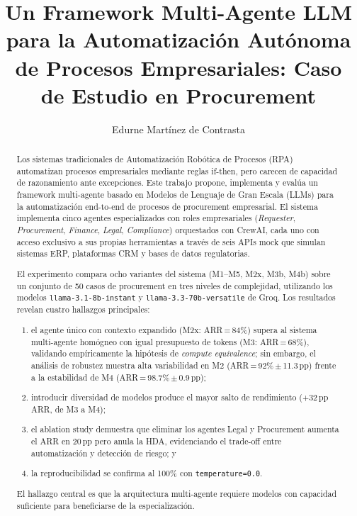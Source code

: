 \documentclass[preprint,12pt,authoryear]{elsarticle}
\begin{document}
\begin{frontmatter}

\title{Un Framework Multi-Agente LLM para la Automatizaci\'on Aut\'onoma
       de Procesos Empresariales: Caso de Estudio en Procurement}

\author[uax,proj]{Edurne Mart\'inez de Contrasta}

\address[uax]{M\'aster en Big Data y Business Analytics,
              Universidad Alfonso X el Sabio, Madrid, Espa\~na}
\address[proj]{PROJENER.AI SL, Madrid, Espa\~na}

\begin{abstract}
Los sistemas tradicionales de Automatizaci\'on Rob\'otica de Procesos (RPA)
automatizan procesos empresariales mediante reglas if-then, pero carecen de
capacidad de razonamiento ante excepciones.
Este trabajo propone, implementa y eval\'ua un framework multi-agente basado en
Modelos de Lenguaje de Gran Escala (LLMs) para la automatizaci\'on end-to-end
de procesos de procurement empresarial.
El sistema implementa cinco agentes especializados con roles empresariales
(\emph{Requester}, \emph{Procurement}, \emph{Finance}, \emph{Legal},
\emph{Compliance}) orquestados con CrewAI, cada uno con acceso exclusivo a sus
propias herramientas a trav\'es de seis APIs mock que simulan sistemas ERP,
plataformas CRM y bases de datos regulatorias.

El experimento compara ocho variantes del sistema (M1--M5, M2x, M3b, M4b) sobre
un conjunto de 50 casos de procurement en tres niveles de complejidad, utilizando
los modelos \texttt{llama-3.1-8b-instant} y \texttt{llama-3.3-70b-versatile} de
Groq. Los resultados revelan cuatro hallazgos principales:
\begin{enumerate}[label=(\arabic*)]
  \item el agente \'unico con contexto expandido (M2x: ARR\,=\,84\%) supera al
        sistema multi-agente hom\'ogneo con igual presupuesto de tokens
        (M3: ARR\,=\,68\%), validando emp\'iricamente la hip\'otesis de
        \emph{compute equivalence}; sin embargo, el an\'alisis de robustez
        muestra alta variabilidad en M2 (ARR\,=\,92\%\,$\pm$\,11.3\,pp)
        frente a la estabilidad de M4 (ARR\,=\,98.7\%\,$\pm$\,0.9\,pp);
  \item introducir diversidad de modelos produce el mayor salto de rendimiento
        (+32\,pp ARR, de M3 a M4);
  \item el ablation study demuestra que eliminar los agentes Legal y Procurement
        aumenta el ARR en 20\,pp pero anula la HDA, evidenciando el trade-off
        entre automatizaci\'on y detecci\'on de riesgo; y
  \item la reproducibilidad se confirma al 100\% con \texttt{temperature=0.0}.
\end{enumerate}
El hallazgo central es que la arquitectura multi-agente requiere modelos con
capacidad suficiente para beneficiarse de la especializaci\'on.
\end{abstract}


\end{frontmatter}
\end{document}

